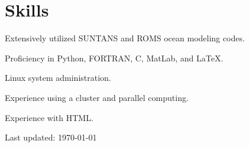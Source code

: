 \documentclass[10pt,letterpaper]{article}
\renewenvironment{itemize}{
  \begin{list}{}{
    \setlength{\leftmargin}{1.5em}
    \setlength{\itemsep}{0.25em}
    \setlength{\parskip}{0pt}
    \setlength{\parsep}{0.25em}
  }
}{
  \end{list}
}
\begin{document}
\section*{Skills}
\begin{itemize}
	\item Extensively utilized SUNTANS and ROMS ocean modeling codes.
	\item Proficiency in Python, FORTRAN, C, MatLab, and \LaTeX.
	\item Linux system administration.
	\item Experience using a cluster and parallel computing.
	\item Experience with HTML.
\end{itemize}



\begin{center}
  \begin{small}
    Last updated: \today
  \end{small}
\end{center}
\end{document}
